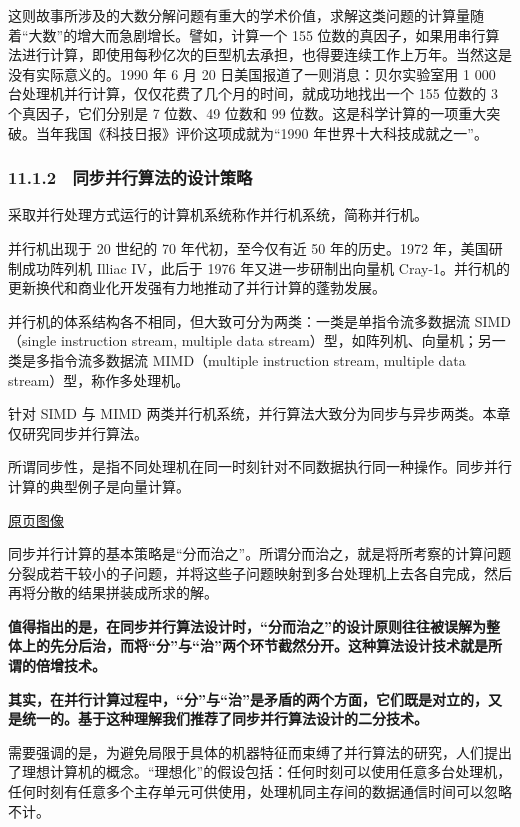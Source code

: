 \documentclass[
  10pt,
  fontset=fandol]{ctexart}
\begin{document}
这则故事所涉及的大数分解问题有重大的学术价值，求解这类问题的计算量随着``大数''的增大而急剧增长。譬如，计算一个 155 位数的真因子，如果用串行算法进行计算，即使用每秒亿次的巨型机去承担，也得要连续工作上万年。当然这是没有实际意义的。1990 年 6 月 20 日美国报道了一则消息：贝尔实验室用 1 000 台处理机并行计算，仅仅花费了几个月的时间，就成功地找出一个 155 位数的 3 个真因子，它们分别是 7 位数、49 位数和 99 位数。这是科学计算的一项重大突破。当年我国《科技日报》评价这项成就为``1990 年世界十大科技成就之一''。

\subsubsection{11.1.2　同步并行算法的设计策略}\label{ux540cux6b65ux5e76ux884cux7b97ux6cd5ux7684ux8bbeux8ba1ux7b56ux7565}

采取并行处理方式运行的计算机系统称作并行机系统，简称并行机。

并行机出现于 20 世纪的 70 年代初，至今仅有近 50 年的历史。1972 年，美国研制成功阵列机 Illiac IV，此后于 1976 年又进一步研制出向量机 Cray-1。并行机的更新换代和商业化开发强有力地推动了并行计算的蓬勃发展。

并行机的体系结构各不相同，但大致可分为两类：一类是单指令流多数据流 SIMD（single instruction stream, multiple data stream）型，如阵列机、向量机；另一类是多指令流多数据流 MIMD（multiple instruction stream, multiple data stream）型，称作多处理机。

针对 SIMD 与 MIMD 两类并行机系统，并行算法大致分为同步与异步两类。本章仅研究同步并行算法。

所谓同步性，是指不同处理机在同一时刻针对不同数据执行同一种操作。同步并行计算的典型例子是向量计算。

\href{../../source-images/pdf-278.jpeg}{原页图像}

同步并行计算的基本策略是``分而治之''。所谓分而治之，就是将所考察的计算问题分裂成若干较小的子问题，并将这些子问题映射到多台处理机上去各自完成，然后再将分散的结果拼装成所求的解。

\textbf{值得指出的是，在同步并行算法设计时，``分而治之''的设计原则往往被误解为整体上的先分后治，而将``分''与``治''两个环节截然分开。这种算法设计技术就是所谓的倍增技术。}

\textbf{其实，在并行计算过程中，``分''与``治''是矛盾的两个方面，它们既是对立的，又是统一的。基于这种理解我们推荐了同步并行算法设计的二分技术。}

需要强调的是，为避免局限于具体的机器特征而束缚了并行算法的研究，人们提出了理想计算机的概念。``理想化''的假设包括：任何时刻可以使用任意多台处理机，任何时刻有任意多个主存单元可供使用，处理机同主存间的数据通信时间可以忽略不计。
\end{document}
